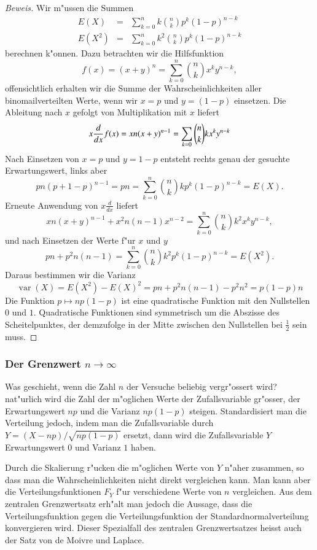 \begin{proof}[Beweis] Wir m"ussen die Summen
\begin{eqnarray*}
E(X)&=&\sum_{k=0}^nk\binom{n}{k}p^k(1-p)^{n-k}\\
E(X^2)&=&\sum_{k=0}^nk^2\binom{n}{k}p^k(1-p)^{n-k}
\end{eqnarray*}
berechnen k"onnen. Dazu betrachten wir die Hilfsfunktion
\[
f(x)=(x+y)^n=\sum_{k=0}^n\binom{n}{k}x^ky^{n-k},
\]
offensichtlich erhalten wir die Summe der Wahrscheinlichkeiten aller
binomailverteilten Werte, wenn
wir $x=p$ und $y=(1-p)$ einsetzen.
Die Ableitung nach $x$ gefolgt von Multiplikation mit $x$ liefert
\[
 x\frac{d}{dx}f(x)
=xn(x+y)^{n-1}\\
=\sum_{k=0}\binom{n}{k}kx^ky^{n-k}
\]
Nach Einsetzen von $x=p$ und $y=1-p$ entsteht rechts genau
der gesuchte Erwartungswert, links aber
\[
pn(p+1-p)^{n-1}=pn=\sum_{k=0}^n\binom{n}{k}kp^k(1-p)^{n-k}=E(X).
\]
Erneute Anwendung von $x\frac{d}{dx}$ liefert
\[
xn(x+y)^{n-1}+x^2 n(n-1)x^{n-2}=\sum_{k=0}^n\binom{n}{k}k^2x^ky^{n-k},
\]
und nach Einsetzen der Werte f"ur $x$ und $y$
\[
pn+p^2n(n-1)=\sum_{k=0}^n\binom{n}{k}k^2p^k(1-p)^{n-k}=E(X^2).
\]
Daraus bestimmen wir die Varianz
\[
\operatorname{var}(X)=E(X^2)-E(X)^2=pn+p^2n(n-1)-p^2n^2=p(1-p)n
\]
Die Funktion $p\mapsto np(1-p)$ ist eine quadratische Funktion mit den
Nullstellen $0$ und $1$. Quadratische Funktionen sind symmetrisch um
die Abszisse des Scheitelpunktes, der demzufolge in der Mitte zwischen
den Nullstellen bei $\frac12$ sein muss.
\end{proof}

\subsubsection{Der Grenzwert $n\to\infty$}
Was geschieht, wenn die Zahl $n$ der Versuche beliebig vergr"ossert wird?
nat"urlich wird die Zahl der m"oglichen Werte der Zufallsvariable
gr"osser, der Erwartungswert $np$ und die Varianz $np(1-p)$ steigen.
Standardisiert man die Verteilung jedoch, indem man die Zufallsvariable
durch $Y=(X-np)/\sqrt{np(1-p)}$ ersetzt, dann wird die Zufallsvariable $Y$
Erwartungswert $0$ und Varianz $1$ haben. 

Durch die Skalierung r"ucken die m"oglichen Werte von $Y$ n"aher zusammen,
so dass man die Wahrscheinlichkeiten nicht direkt vergleichen kann.
Man kann aber die Verteilungsfunktionen $F_Y$ f"ur verschiedene Werte
von $n$ vergleichen. Aus dem zentralen Grenzwertsatz erh"alt man
jedoch die Aussage, dass die Verteilungsfunktion gegen die
Verteilungsfunktion der Standardnormalverteilung konvergieren wird.
Dieser Spezialfall des zentralen Grenzwertsatzes heisst auch der
Satz von de Moivre und Laplace.

